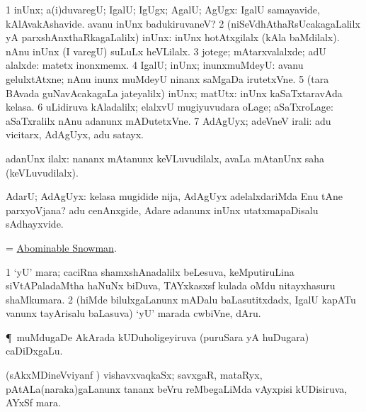 \bentry
{} 
\gl{\kirxvi} 
\bmng
\bnum
\num{1} inUnx; a(i)duvaregU; IgalU; IgUgx; AgalU; AgUgx:  IgalU samayavide, kAlAvakAshavide.  avanu inUnx badukiruvaneV?
\num{2} (niSeVdhAthaRsUcakagaLalilx yA parxshAnxthaRkagaLalilx) inUnx:  inUnx hotAtxgilalx (kAla baMdilalx).   nAnu inUnx (I varegU) suLuLx heVLilalx. 
\num{3}  jotege; mAtarxvalalxde; adU alalxde:  matetx inonxmemx. 
\num{4} IgalU; inUnx; inunxmuMdeyU:  avanu gelulxtAtxne; nAnu inunx muMdeyU ninanx saMgaDa irutetxVne. 
\num{5} (tara BAvada guNavAcakagaLa jateyalilx) inUnx; matUtx:  inUnx kaSaTxtaravAda kelasa.  
\num{6} uLidiruva kAladalilx; elalxvU mugiyuvudara oLage; aSaTxroLage:  aSaTxralilx nAnu adanunx mADutetxVne. 
\num{7} AdAgUyx; adeVneV irali: adu vicitarx, AdAgUyx, adu satayx.
\enum
\emng

\noindent
\gl{\pagu} 
\bmng
{} adanUnx ilalx:  nananx mAtanunx keVLuvudilalx, avaLa mAtanUnx saha (keVLuvudilalx).
\emng
\eentry

\bentry
{} 
\gl{\BAavayx} 
\bmng
AdarU; AdAgUyx:  kelasa mugidide nija,  AdAgUyx adelalxdariMda Enu tAne parxyoVjana?   adu cenAnxgide, Adare adanunx inUnx utatxmapaDisalu sAdhayxvide.
\emng
\eentry

\bentry
{} 
\gl{\nA} 
\bmng
 = \hyperref{kandict_a.pdf}{A}{Abominable Snowman}{Abominable Snowman}.
\emng
\eentry

\bentry
{} 
\gl{\nA} 
\bmng
\bnum
\num{1} `yU' mara; caciRna shamxshAnadalilx beLesuva, keMputiruLina siVtAPaladaMtha haNuNx biDuva, TAYxkasxsf kulada oMdu nitayxhasuru shaMkumara. 
\num{2} (hiMde bilulxgaLanunx mADalu baLasutitxdadx, IgalU kapATu \mo vanunx tayArisalu baLasuva) `yU'  marada cwbiVne, dAru.
\enum
\emng
\eentry

\bentry
{} 
\gl{\nA}
\bmng
\P\ muMdugaDe   AkArada kUDuholigeyiruva (puruSara yA huDugara) caDiDxgaLu.
\emng
\eentry

\bentry
{} 
\gl{\nA}
\bmng
(sAkxMDineVviyanf \pu)  vishavxvaqkaSx; savxgaR, mataRyx, pAtALa(naraka)gaLanunx tananx  beVru reMbegaLiMda vAyxpisi kUDisiruva, AYxSf mara.
\emng
\eentry

